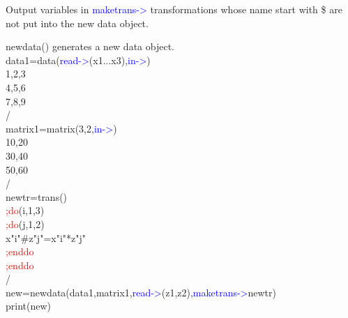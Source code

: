 \begin{note}
Output variables in \textcolor{blue}{maketrans->} transformations whose name start with \$ are not put into the new data object.
\end{note}
\begin{example}[newdataex]newdata() generates a new data object.\\
\label{newdataex}
data1=\textcolor{VioletRed}{data}(\textcolor{blue}{read->}(x1...x3),\textcolor{blue}{in->})\\
1,2,3\\
4,5,6\\
7,8,9\\
/\\
matrix1=\textcolor{VioletRed}{matrix}(3,2,\textcolor{blue}{in->})\\
10,20\\
30,40\\
50,60\\
/\\
newtr=\textcolor{VioletRed}{trans}()\\
\textcolor{Red}{;do}(i,1,3)\\
\textcolor{Red}{;do}(j,1,2)\\
x"i"\#z"j"=x"i"*z"j"\\
\textcolor{Red}{;enddo}\\
\textcolor{Red}{;enddo}\\
/\\
new=\textcolor{VioletRed}{newdata}(data1,matrix1,\textcolor{blue}{read->}(z1,z2),\textcolor{blue}{maketrans->}newtr)\\
\textcolor{VioletRed}{print}(new)
\end{example}
